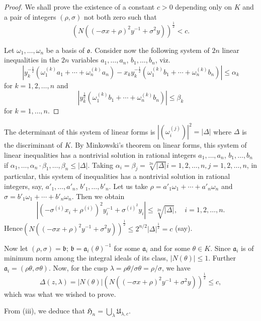 \begin{proof}
We shall prove the existence of a constant $c>0$ depending only on $K$
and a pair of integers $(\rho,\sigma)$ not both zero such that
$$
(N((-\sigma x+\rho)^{2}y^{-1}+\sigma^{2}y))^{\frac{1}{2}}<c.
$$

Let $\omega_{1},\ldots,\omega_{n}$ be a basis of
$\mathfrak{o}$. Consider now the following system of $2n$ linear
inequalities in the $2n$ variables $a_{1},\ldots,a_{n}$,
$b_{1},\ldots,b_{n}$, viz.
$$
\left|y^{-\frac{1}{2}}_{k}(\omega^{(k)}_{1}a_{1}+\cdots+\omega^{(k)}_{n}a_{n})-x_{k}y^{-\frac{1}{2}}_{k}(\omega^{(k)}_{1}b_{1}+\cdots+\omega^{(k)}_{n}b_{n})\right|\leq
\alpha_{k} 
$$
for $k=1,2,\ldots,n$ and
$$
\left|y^{\frac{1}{2}}_{k}(\omega^{(k)}_{1}b_{1}+\cdots+\omega^{(k)}_{n}b_{n})\right|\leq
\beta_{k} 
$$
for $k=1,\ldots,n$.
\end{proof}

The determinant of this system of linear forms is
$|(\omega^{(j)}_{i})|^{2}=|\Delta|$ where $\Delta$ is the discriminant
of $K$. By Minkowski's theorem on linear forms, this system of linear
inequalities has a nontrivial solution in rational integers
$a_{1},\ldots,a_{n}$, $b_{1},\ldots,b_{n}$ if
$\alpha_{1},\ldots,\alpha_{n}\cdot \beta_{1},\ldots,\beta_{n}\leq
|\Delta|$. Taking
$\alpha_{i}=\beta_{j}=\sqrt[2n]{|\Delta|}i=1,2,\ldots,n,j=1,2,\ldots,n$,
in particular, this system of inequalities has a nontrivial solution
in rational integers, say, $a'_{1},\ldots,a'_{n}$,
$b'_{1},\ldots,b'_{n}$. Let us take
$\rho=a'_{1}\omega_{1}+\cdots+a'_{n}\omega_{n}$ and
$\sigma=b'_{1}\omega_{1}+\cdots+b'_{n}\omega_{n}$. Then we obtain
$$
\left|(-\sigma^{(i)}x_{i}+\rho^{(i)})^{2}y^{-1}_{i}+\sigma^{(i)^{2}}y_{i}\right|\leq
\sqrt[2n]{|\Delta|},\quad i=1,2,\ldots,n. 
$$
Hence\pageoriginale $(N((-\sigma
x+\rho)^{2}y^{-1}+\sigma^{2}y))^{\frac{1}{2}}\leq
2^{n/2}|\Delta|^{\frac{1}{2}}=c$ (say). 

Now let $(\rho,\sigma)=\mathfrak{b}$;
$\mathfrak{b}=\mathfrak{a}_{i}(\theta)^{-1}$ for some
$\mathfrak{a}_{i}$ and for some $\theta\in K$. Since
$\mathfrak{a}_{i}$ is of minimum norm among the integral ideals of its
class, $|N(\theta)|\leq 1$. Further
$\mathfrak{a}_{i}=(\rho\theta,\sigma\theta)$. Now, for the cusp
$\lambda=\rho\theta/\sigma\theta=\rho/\sigma$, we have
$$
\Delta(z,\lambda)=|N(\theta)|(N((-\sigma
x+\rho)^{2}y^{-1}+\sigma^{2}y))^{\frac{1}{2}}\leq c,
$$
which was what we wished to prove.

From (iii), we deduce that
$\mathfrak{H}_{n}=\bigcup\limits_{\lambda}\mathfrak{U}_{\lambda,c}$.

